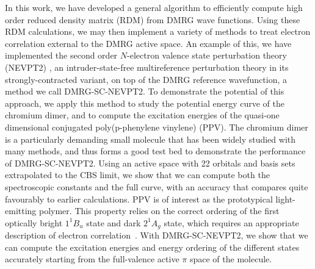 In this work, we have developed a general algorithm to efficiently compute high order reduced density matrix (RDM) from DMRG wave functions. 
Using these RDM calculations, we may then implement a variety of methods to treat electron correlation external to the DMRG active space.
An example of this, we have implemented the second order $N$-electron valence state perturbation theory (NEVPT2) 
\cite{angeli_introduction_2001,angeli_n-electron_2001, angeli_n-electron_2002}, an intruder-state-free multireference perturbation theory in its strongly-contracted variant, on top
of the DMRG reference wavefunction, a method we call DMRG-SC-NEVPT2.
To demonstrate the potential of this approach, we apply this method to study the potential energy curve of the chromium dimer, and 
to compute the excitation energies of the quasi-one dimensional conjugated poly(p-phenylene vinylene) (PPV). 
The chromium dimer is a particularly demanding small molecule that has been widely studied with many methods\cite{roos_ground_2003,celani_cipt2_2004,angeli_third-order_2006,muller_large-scale_2009,kurashige_second-order_2011,ruiperez_complete_2011,kurashige_multireference_2014,sharma_multireference_2015}, and thus forms a good test bed to demonstrate the performance of DMRG-SC-NEVPT2. Using an active space with 22 orbitals and basis sets extrapolated to the CBS limit, we show that we can
compute both the spectroscopic constants and the full curve,
with an accuracy that compares quite favourably to earlier calculations.
PPV is of interest as the prototypical light-emitting polymer\cite{burroughes_light-emitting_1990,friend_electroluminescence_1999}. This property relies
on the correct ordering of the first optically bright $1^{1}B_{u}$ state
and  dark $2^{1}A_{g}$ state, which requires an appropriate
description of electron correlation~\cite{beljonne_theoretical_1995,lavrentiev_theoretical_1999,shukla_correlated_2002, han_time-dependent_2004, saha_investigation_2007, bursill_symmetry-adapted_2009}.
With DMRG-SC-NEVPT2, we show that we can compute the excitation 
energies and energy ordering of the different states accurately starting 
from the full-valence active $\pi$ space of the molecule.

